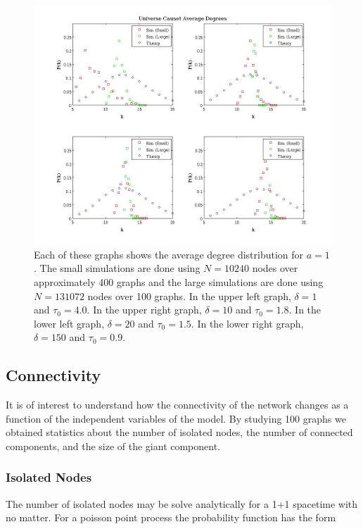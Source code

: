 \documentclass[preprint,notitlepage,amsmath,amssymb,floatfix]{revtex4-1}
\begin{document}
\begin{figure}
\includegraphics[width=18cm]{figures/avg_degrees.jpg}
\caption{Each of these graphs shows the average degree distribution for $a = 1$.  The small simulations are done using $N = 10240$ nodes over approximately 400 graphs and the large simulations are done using $N = 131072$ nodes over 100 graphs.  In the upper left graph, $\delta = 1$ and $\tau_0 = 4.0$.  In the upper right graph, $\delta = 10$ and $\tau_0 = 1.8$.  In the lower left graph, $\delta = 20$ and $\tau_0 = 1.5$.  In the lower right graph, $\delta = 150$ and $\tau_0 = 0.9$.}
\label{fig:avg_deg_uni}
\centering
\end{figure}

\subsection{Connectivity}
It is of interest to understand how the connectivity of the network changes as a function of the independent variables of the model.
By studying 100 graphs we obtained statistics about the number of isolated nodes, the number of connected components, and the size of the giant component.
\subsubsection{Isolated Nodes}
The number of isolated nodes may be solve analytically for a 1+1 spacetime with no matter.  For a poisson point process the probability function has the form
\end{document}
